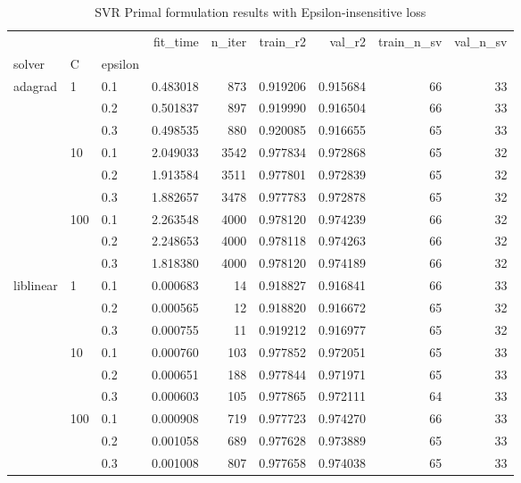 \begin{table}[h!]
\centering
\caption{SVR Primal formulation results with Epsilon-insensitive loss}
\label{primal_svr_eps_cv_results}
\begin{tabular}{lllrrrrrr}
\toprule
          &     &     &  fit\_time &  n\_iter &  train\_r2 &    val\_r2 &  train\_n\_sv &  val\_n\_sv \\
solver & C & epsilon &           &         &           &           &             &           \\
\midrule
adagrad & 1   & 0.1 &  0.483018 &     873 &  0.919206 &  0.915684 &          66 &        33 \\
          &     & 0.2 &  0.501837 &     897 &  0.919990 &  0.916504 &          66 &        33 \\
          &     & 0.3 &  0.498535 &     880 &  0.920085 &  0.916655 &          65 &        33 \\
          & 10  & 0.1 &  2.049033 &    3542 &  0.977834 &  0.972868 &          65 &        32 \\
          &     & 0.2 &  1.913584 &    3511 &  0.977801 &  0.972839 &          65 &        32 \\
          &     & 0.3 &  1.882657 &    3478 &  0.977783 &  0.972878 &          65 &        32 \\
          & 100 & 0.1 &  2.263548 &    4000 &  0.978120 &  0.974239 &          66 &        32 \\
          &     & 0.2 &  2.248653 &    4000 &  0.978118 &  0.974263 &          66 &        32 \\
          &     & 0.3 &  1.818380 &    4000 &  0.978120 &  0.974189 &          66 &        32 \\
liblinear & 1   & 0.1 &  0.000683 &      14 &  0.918827 &  0.916841 &          66 &        33 \\
          &     & 0.2 &  0.000565 &      12 &  0.918820 &  0.916672 &          65 &        32 \\
          &     & 0.3 &  0.000755 &      11 &  0.919212 &  0.916977 &          65 &        32 \\
          & 10  & 0.1 &  0.000760 &     103 &  0.977852 &  0.972051 &          65 &        33 \\
          &     & 0.2 &  0.000651 &     188 &  0.977844 &  0.971971 &          65 &        33 \\
          &     & 0.3 &  0.000603 &     105 &  0.977865 &  0.972111 &          64 &        33 \\
          & 100 & 0.1 &  0.000908 &     719 &  0.977723 &  0.974270 &          66 &        33 \\
          &     & 0.2 &  0.001058 &     689 &  0.977628 &  0.973889 &          65 &        33 \\
          &     & 0.3 &  0.001008 &     807 &  0.977658 &  0.974038 &          65 &        33 \\
\bottomrule
\end{tabular}
\end{table}
